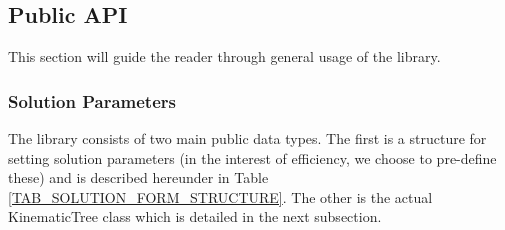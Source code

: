 \documentclass[12pt,a4paper,onecolumn]{article}
\begin{document}
\newpage
\subsection{Public API}
This section will guide the reader through general usage of the library.

\subsubsection*{Solution Parameters}
\label{SOLUTION_PARAMS}
The library consists of two main public data types. The first is a structure for setting solution parameters (in the interest of efficiency, we choose to pre-define these) and is described hereunder in Table \ref{TAB_SOLUTION_FORM_STRUCTURE}. The other is the actual KinematicTree class which is detailed in the next subsection.
\end{document}
